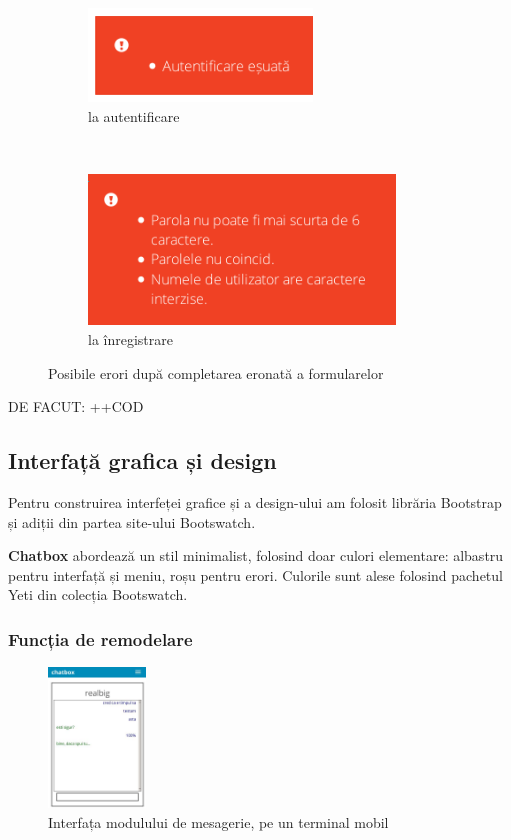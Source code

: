 \documentclass[12pt,a4paper]{article}
\begin{document}
\begin{figure}[h!]
        \centering
        \begin{subfigure}[b]{0.35\textwidth}
                \includegraphics[height=2.5cm]{img/fail1.png}
                \caption{la autentificare}
        \end{subfigure}%
        ~ \qquad 
        \begin{subfigure}[b]{0.55\textwidth}
                \includegraphics[height=4cm]{img/fail2.png}
                \caption{la înregistrare}
        \end{subfigure}
        \caption{Posibile erori după completarea eronată a formularelor}%
\end{figure}

DE FACUT: ++COD
\newpage
\subsection{Interfață grafica și design}
Pentru construirea interfeței grafice și a design-ului am folosit librăria Bootstrap\cite{bootstrap} și adiții din partea site-ului Bootswatch\cite{bootswatch}.

\textbf{Chatbox} abordează un stil minimalist, folosind doar culori elementare: 
albastru pentru interfață și meniu, roșu pentru erori. Culorile sunt alese folosind 
pachetul Yeti\cite{yeti} din colecția Bootswatch.

\subsubsection{Funcția de remodelare}

\begin{figure} %
    \centering
    \vspace{-20px}
    \includegraphics[width=0.23\textwidth]{img/chat_mobil.jpg}
	\caption{Interfața modulului de mesagerie, pe un terminal mobil}
	\label{fig:mobil}
\end{figure}
\end{document}
